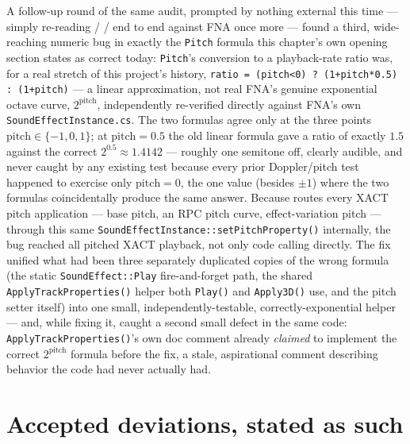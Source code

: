 A follow-up round of the same audit, prompted by nothing external this time --- simply
re-reading  /  /
 end to end against FNA once more --- found a third,
wide-reaching numeric bug in exactly the \texttt{Pitch} formula this chapter's own opening
section states as correct today: \texttt{Pitch}'s conversion to a playback-rate ratio was, for a
real stretch of this project's history, \texttt{ratio = (pitch<0) ? (1+pitch*0.5) :
(1+pitch)} --- a linear approximation, not real FNA's genuine exponential octave curve,
$2^{\text{pitch}}$, independently re-verified directly against FNA's own
\texttt{SoundEffectInstance.cs}. The two formulas agree only at the three points
$\text{pitch} \in \{-1, 0, 1\}$; at $\text{pitch} = 0.5$ the old linear formula gave a ratio of
exactly $1.5$ against the correct $2^{0.5} \approx 1.4142$ --- roughly one semitone off, clearly
audible, and never caught by any existing test because every prior Doppler/pitch test happened
to exercise only $\text{pitch} = 0$, the one value (besides $\pm 1$) where the two formulas
coincidentally produce the same answer. Because  routes every XACT pitch
application --- base pitch, an RPC pitch curve, effect-variation pitch --- through this same
\texttt{SoundEffectInstance::setPitchProperty()} internally, the bug reached all pitched XACT
playback, not only code calling  directly. The fix unified
what had been three separately duplicated copies of the wrong formula (the static
\texttt{SoundEffect::Play} fire-and-forget path, the shared \texttt{ApplyTrackProperties()}
helper both \texttt{Play()} and \texttt{Apply3D()} use, and the pitch setter itself) into one
small, independently-testable, correctly-exponential helper --- and, while fixing it, caught a
second small defect in the same code: \texttt{ApplyTrackProperties()}'s own doc comment already
\emph{claimed} to implement the correct $2^{\text{pitch}}$ formula before the fix, a stale,
aspirational comment describing behavior the code had never actually had.

\section{Accepted deviations, stated as such}

